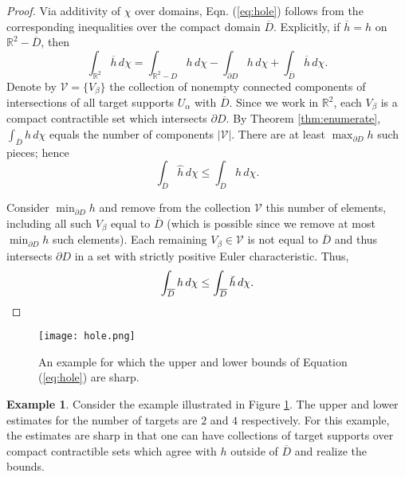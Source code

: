 \documentclass{psapm-l}
\theoremstyle{definition}
\newtheorem{example}[theorem]{Example}
\theoremstyle{remark}
\numberwithin{equation}{section}
\begin{document}
\begin{proof}
Via additivity of $\chi$ over domains, Eqn. (\ref{eq:hole}) follows from the corresponding inequalities over the compact domain $\overline{D}$. Explicitly, if $\overline{h}=h$ on ${{\mathbb R}}^2-\overline{D}$, then
\[
\int_{{{\mathbb R}}^2}\overline{h}\,d\chi
    =
    \int_{{{\mathbb R}}^2-D}h\,d\chi
    -
    \int_{\partial D}h\,d\chi
    +
    \int_{\overline{D}}\overline{h}\,d\chi  .
\]
Denote by ${{\mathcal V}}=\{V_\beta\}$ the collection of nonempty connected components of intersections of all target supports $U_\alpha$ with
$\overline{D}$. Since we work in ${{\mathbb R}}^2$, each $V_\beta$ is a compact contractible set which intersects $\partial D$. By Theorem
\ref{thm:enumerate}, $\int_{\overline{D}}h\,d\chi$ equals the number of components ${\left\vert{{{\mathcal V}}}\right\vert}$. There are at least $\max_{\partial D}h$
such pieces; hence
\[
\int_{\overline{D}}\hat{h}\,d\chi  \leq \int_{\overline{D}}h\,d\chi
.
\]

Consider $\min_{\partial D}h$ and remove from the collection ${{\mathcal V}}$ this number of elements, including all such $V_\beta$ equal to
$\overline{D}$ (which is possible since we remove at most $\min_{\partial D}h$ such elements). Each remaining $V_\beta\in{{\mathcal V}}$ is not equal to $\overline{D}$ and thus intersects $\partial D$ in a set with strictly positive Euler characteristic. Thus,
\[
    \int_{\overline{D}} h\,d\chi
    \leq
    \int_{\overline{D}}{\rlap{\smash{\raisebox{2.25ex}{{\raisebox{1ex}{\rotatebox{180}{{$\hat{~}\,$}}}}}}}{h}}\,d\chi.
\]
\end{proof}

\begin{figure}[hbt]
\begin{center}
\texttt{[image: hole.png]}
\caption{An example for which the upper and lower bounds of Equation (\ref{eq:hole}) are sharp.}
\label{fig:hole}
\end{center}
\end{figure}

\begin{example}
\label{ex:hole}
Consider the example illustrated in Figure \ref{fig:hole}. The upper and lower estimates for the number of targets are $2$ and $4$ respectively. For this example, the estimates are sharp in that one can have collections of target supports over compact contractible sets which agree with $h$ outside of $\overline{D}$ and realize the bounds.
\end{example}
\end{document}

